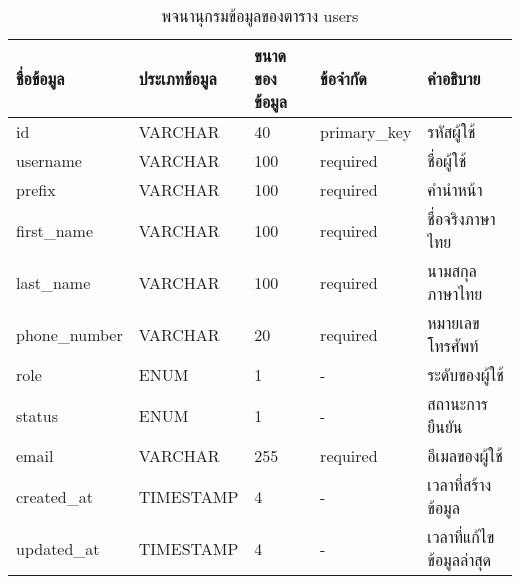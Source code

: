 \begin{table}[H]
    \caption{พจนานุกรมข้อมูลของตาราง users}
    \label{tab:database-users}
    \begin{tabularx}{\textwidth}{ | p{2.5cm} | p{2.20cm} | p{2.45cm} | p{2.05cm} | X | }
    \hline
    \textbf{ชื่อข้อมูล} & \textbf{ประเภทข้อมูล} & \textbf{ขนาดของข้อมูล} & \textbf{ข้อจำกัด} & \textbf{คำอธิบาย} \\
    \hline
    id & VARCHAR & 40 & primary\_key & รหัสผู้ใช้ \\
    \hline
    username & VARCHAR & 100 & required & ชื่อผู้ใช้ \\
    \hline
    prefix & VARCHAR & 100 & required & คำนำหน้า \\
    \hline
    first\_name & VARCHAR & 100 & required & ชื่อจริงภาษาไทย \\
    \hline
    last\_name & VARCHAR & 100 & required & นามสกุลภาษาไทย \\
    \hline
    phone\_number & VARCHAR & 20 & required & หมายเลขโทรศัพท์ \\
    \hline
    role & ENUM & 1 & - & ระดับของผู้ใช้ \\
    \hline
    status & ENUM & 1 & - & สถานะการยืนยัน \\
    \hline
    email & VARCHAR & 255 & required & อีเมลของผู้ใช้ \\
    \hline
    created\_at & TIMESTAMP & 4 & - & เวลาที่สร้างข้อมูล \\
    \hline
    updated\_at & TIMESTAMP & 4 & - & เวลาที่แก้ไขข้อมูลล่าสุด \\
    \hline
    \end{tabularx}
\end{table}
